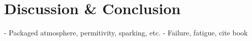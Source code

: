 \section{Discussion \& Conclusion}
\label{sec:conclusion}
- Packaged atmosphere, permitivity, sparking, etc.
- Failure, fatigue, cite book


